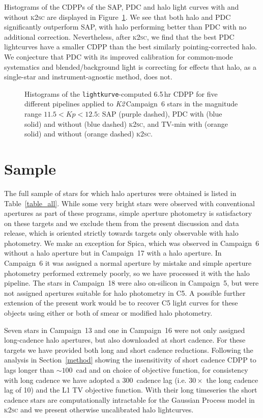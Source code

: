 \documentclass[modern]{aastex62}
\newcommand\ktwo{\emph{K2}\,}
\begin{document}
Histograms of the CDPPs of the SAP, PDC and halo light curves with and without \textsc{k2sc} are displayed in Figure~\ref{fig:cdpphists}. We see that both halo and PDC significantly outperform SAP, with halo performing better than PDC with no additional correction. Nevertheless, after \textsc{k2sc}, we find that the best PDC lightcurves have a smaller CDPP than the best similarly pointing-corrected halo. We conjecture that PDC with its improved calibration for common-mode systematics and blended/background light is correcting for effects that halo, as a single-star and instrument-agnostic method, does not.

\begin{figure}
\caption{Histograms of the \texttt{lightkurve}-computed 6.5\,hr CDPP for five different pipelines applied to \ktwo Campaign~6 stars in the magnitude range $11.5 < Kp < 12.5$: SAP (purple dashed), PDC with (blue solid) and without (blue dashed) \textsc{k2sc}, and TV-min with (orange solid) and without (orange dashed) \textsc{k2sc}.}
\label{fig:cdpphists}
\end{figure}


\section{Sample}
\label{sec:sample}


The full sample of stars for which halo apertures were obtained is listed in Table~\ref{table_all}. While some very bright stars were observed with conventional apertures as part of these programs, simple aperture photometry is satisfactory on these targets and we exclude them from the present discussion and data release, which is oriented strictly towards targets only observable with halo photometry. 
We make an exception for Spica, which was observed in Campaign~6 without a halo aperture but in Campaign~17 with a halo aperture. In Campaign~6 it was assigned a normal aperture by mistake and simple aperture photometry performed extremely poorly, so we have processed it with the halo pipeline. The stars in Campaign~18 were also on-silicon in Campaign~5, but were not assigned apertures suitable for halo photometry in C5. A possible further extension of the present work would be to recover C5 light curves for these objects using either or both of smear or modified halo photometry.

Seven stars in Campaign~13 and one in Campaign~16 were not only assigned long-cadence halo apertures, but also downloaded at short cadence. For these targets we have provided both long and short cadence reductions. Following the analysis in Section~\ref{method} showing the insensitivity of short cadence CDPP to lags longer than $\sim 100$~cad and on choice of objective function, for consistency with long cadence we have adopted a 300~cadence lag (i.e. $30 \times$ the long cadence lag of 10) and the L1 TV objective function. With their long timeseries the short cadence stars are computationally intractable for the Gaussian Process model in \textsc{k2sc} and we present otherwise uncalibrated halo lightcurves.
\end{document}
